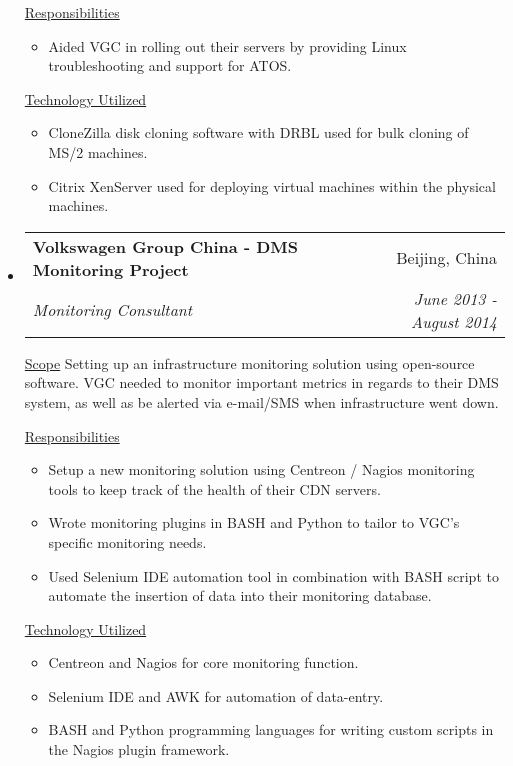 \documentclass[a4paper,11pt]{article}
\makeatletter
\newcommand{\resitem}[1]{\item #1 \vspace{-2pt}}
\newcommand{\ressubheading}[4]{
\begin{tabular*}{6.5in}{l@{\cftdotfill{\cftsecdotsep}\extracolsep{\fill}}r}
		\textbf{#1} & #2 \\
		\textit{#3} & \textit{#4} \\
\end{tabular*}\vspace{-6pt}}
\makeatother
\begin{document}
\begin{itemize}
		\underline{Responsibilities}
		\begin{itemize}
			\resitem{Aided VGC in rolling out their servers by providing Linux troubleshooting and support for ATOS.}
		\end{itemize}
		
		\underline{Technology Utilized}
		\begin{itemize}
			\resitem{CloneZilla disk cloning software with DRBL used for bulk cloning of MS/2 machines.}
			\resitem{Citrix XenServer used for deploying virtual machines within the physical machines.}
		\end{itemize}

	\item
		\ressubheading{Volkswagen Group China - DMS Monitoring Project}{Beijing, China}{Monitoring Consultant}{June 2013 - August 2014}
		\linebreak
		\linebreak

		\underline{Scope}
		\linebreak
		\linebreak
		Setting up an infrastructure monitoring solution using open-source software. VGC needed to monitor important metrics in regards to their DMS system, as well as be alerted via e-mail/SMS when infrastructure went down.

		\underline{Responsibilities}
		\begin{itemize}
			\resitem{Setup a new monitoring solution using Centreon / Nagios monitoring tools to keep track of the health of their CDN servers.}
			\resitem{Wrote monitoring plugins in BASH and Python to tailor to VGC's specific monitoring needs.}
			\resitem{Used Selenium IDE automation tool in combination with BASH script to automate the insertion of data into their monitoring database.}
		\end{itemize}

		\underline{Technology Utilized}
		\begin{itemize}
			\resitem{Centreon and Nagios for core monitoring function.}
			\resitem{Selenium IDE and AWK for automation of data-entry.}
			\resitem{BASH and Python programming languages for writing custom scripts in the Nagios plugin framework.}
		\end{itemize}

\end{itemize}
\end{document}
